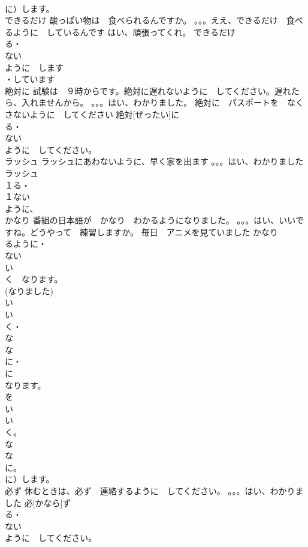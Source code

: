 \documentclass[8pt]{extreport}
\begin{document}
\begin{CJK}{UTF8}{min}
\\	に）します。
\\	できるだけ	酸っぱい物は　食べられるんですか。 。。。ええ、できるだけ　食べるように　しているんです はい、頑張ってくれ。	できるだけ			
\\	る・
\\	ない
\\	ように　します
\\	・しています
\\	絶対に	試験は　９時からです。絶対に遅れないように　してください。遅れたら、入れませんから。 。。。はい、わかりました。 絶対に　パスポートを　なくさないように　してください	絶対[ぜったい]に			
\\	る・
\\	ない
\\	ように　してください。
\\	ラッシュ	ラッシュにあわないように、早く家を出ます 。。。はい、わかりました	ラッシュ			
\\	１る・
\\	１ない
\\	ように、
\\	かなり	番組の日本語が　かなり　わかるようになりました。 。。。はい、いいですね。どうやって　練習しますか。 毎日　アニメを見ていました	かなり			
\\	るように・
\\	ない
\\	い　
\\	く　なります。
\\	(なりました) 
\\	い
\\	い
\\	く・
\\	な
\\	な
\\	に・
\\	に　
\\	なります。
\\	を
\\	い
\\	い
\\	く。
\\	な
\\	な
\\	に。
\\	に）します。
\\	必ず	休むときは、必ず　連絡するように　してください。 。。。はい、わかりました	必[かなら]ず			
\\	る・
\\	ない
\\	ように　してください。

\end{CJK}
\end{document}
